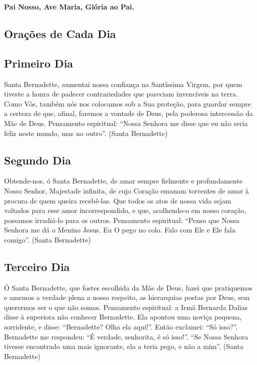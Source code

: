 \documentclass[18pt]{article}
\begin{document}
\begin{justify}
\textbf{Pai Nosso, Ave Maria, Glória ao Pai.}


\subsection{Orações de Cada Dia}



\subsection*{Primeiro Dia}

\textbf{\textit{}} %

Santa Bernadette, aumentai nossa confiança na Santíssima Virgem, por quem tiveste a honra de padecer contrariedades que pareciam invencíveis na terra. Como Vós, também nós nos colocamos sob a Sua proteção, para guardar sempre a certeza de que, afinal, faremos a vontade de Deus, pela poderosa intercessão da Mãe de Deus. Pensamento espiritual: “Nossa Senhora me disse que eu não seria feliz neste mundo, mas no outro”. (Santa Bernadette)

\textbf{\textit{}} %

\subsection*{Segundo Dia}

\textbf{\textit{}} %

Obtende-nos, ó Santa Bernadette, de amar sempre fielmente e profundamente Nosso Senhor, Majestade infinita, de cujo Coração emanam torrentes de amor à procura de quem queira recebê-las. Que todos os atos de nossa vida sejam voltados para esse amor incorrespondido, e que, acolhendo-o em nosso coração, possamos irradiá-lo para os outros. Pensamento espiritual: “Penso que Nossa Senhora me dá o Menino Jesus. Eu O pego no colo. Falo com Ele e Ele fala comigo”. (Santa Bernadette)

\textbf{\textit{}} %

\subsection*{Terceiro Dia}

\textbf{\textit{}} %

Ó Santa Bernadette, que fostes escolhida da Mãe de Deus, fazei que pratiquemos e amemos a verdade plena a nosso respeito, as hierarquias postas por Deus, sem querermos ser o que não somos. Pensamento espiritual: a Irmã Bernarda Dalias disse à superiora não conhecer Bernadette. Ela apontou uma noviça pequena, sorridente, e disse: “Bernadette? Olha ela aqui!”. Então exclamei: “Só isso?”. Bernadette me respondeu: “É verdade, senhorita, é só isso!”. “Se Nossa Senhora tivesse encontrado uma mais ignorante, ela a teria pego, e não a mim”. (Santa Bernadette)


\end{justify}
\end{document}

